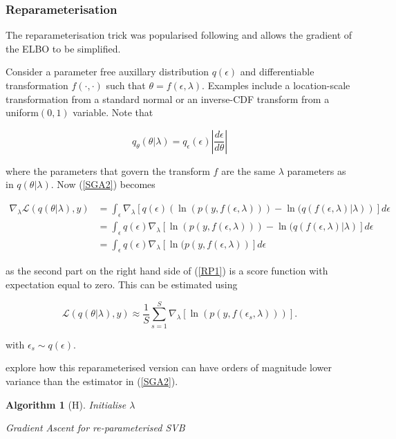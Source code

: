 \documentclass{article}\usepackage[]{graphicx}\usepackage[]{color}
\newtheorem{algorithm}[theorem]{Algorithm}
\begin{document}
\subsubsection{Reparameterisation}

The reparameterisation trick was popularised following \citet{Kingma2013} and allows the gradient of the ELBO to be simplified.

Consider a parameter free auxillary distribution $q(\epsilon)$ and differentiable transformation $f(\cdot,\cdot)$ such that $\theta = f(\epsilon, \lambda)$. Examples include a location-scale transformation from a standard normal or an inverse-CDF transform from a uniform$(0, 1)$ variable. Note that 

$$q_\theta(\theta | \lambda) = q_\epsilon(\epsilon) \left| \frac{d\epsilon}{d\theta} \right| $$

where the parameters that govern the transform $f$ are the same $\lambda$ parameters as in $q(\theta | \lambda)$. Now (\ref{SGA2}) becomes

\begin{align}
\nabla_{\lambda} \mathcal{L}(q(\theta | \lambda), y) &=  \int_{\epsilon} \nabla_{\lambda}[  q(\epsilon) \left( \ln (p(y, f(\epsilon, \lambda))) - \ln(q(f(\epsilon, \lambda) | \lambda) \right)] d\epsilon \nonumber \\
&=  \int_{\epsilon}  q(\epsilon) \nabla_{\lambda} \left[ \ln (p(y, f(\epsilon, \lambda))) - \ln(q(f(\epsilon, \lambda)| \lambda) \right] d\epsilon \label{RP1} \\
&= \int_{\epsilon}  q(\epsilon) \nabla_{\lambda} \left[ \ln (p(y, f(\epsilon, \lambda)) \right] d\epsilon\nonumber
\end{align}

as the second part on the right hand side of (\ref{RP1}) is a score function with expectation equal to zero. This can be estimated using 

\begin{equation}
\label{RP2}
 \mathcal{L}(q(\theta | \lambda), y) \approx  \frac{1}{S}\sum_{s=1}^{S} \nabla_{\lambda} \left[ \ln (p(y, f(\epsilon_s, \lambda))) \right].
\end{equation}

with $\epsilon_s \sim q(\epsilon)$.

\citet{Kingma2015} explore how this reparameterised version can have orders of magnitude lower variance than the estimator in (\ref{SGA2}).

\begin{algorithm}[H]
 Initialise $\lambda$\;
 \caption{Gradient Ascent for re-parameterised SVB}
  \label{alg:algorithm4}
\end{algorithm}
\end{document}
